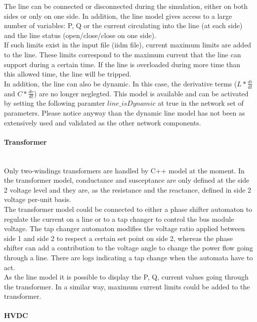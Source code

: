 \documentclass[a4paper, 12pt]{report}
\begin{document}
The line can be connected or disconnected during the simulation, either on both sides or only on one side. In addition, the line model gives access to a large number of variables: P, Q or the current circulating into the line (at each side) and the line status (open/close/close on one side). \\
If such limits exist in the input file (iidm file), current maximum limits are added to the line. These limits correspond to the maximum current that the line can support during a certain time. If the line is overloaded during more time than this allowed time, the line will be tripped. \\

In addition, the line can also be dynamic. In this case, the derivative terms ($L * \frac{di}{dt}$ and $C * \frac{dv}{dt}$) are no longer neglegted. This model is available and can be activated by setting the following paramter $line\_isDynamic$ at true in the network set of parameters. Please notice anyway than the dynamic line model has not been as extensively used and validated as the other network components.

\paragraph{Transformer}
~~\\

Only two-windings transformers are handled by \Dynawo C++ model at the moment. In the transformer model, conductance and susceptance are only defined at the side 2 voltage level and they are, as the resistance and the reactance, defined in side 2 voltage per-unit basis. \\
The transformer model could be connected to either a phase shifter automaton to regulate the current on a line or to a tap changer to control the bus module voltage. The tap changer automaton modifies the voltage ratio applied between side 1 and side 2 to respect a certain set point on side 2, whereas the phase shifter can add a contribution to the voltage angle to change the power flow going through a line. There are logs indicating a tap change when the automata have to act. \\
As the line model it is possible to display the P, Q, current values going through the transformer. In a similar way, maximum current limits could be added to the transformer. \\

\paragraph{HVDC}
~~\\
\end{document}
